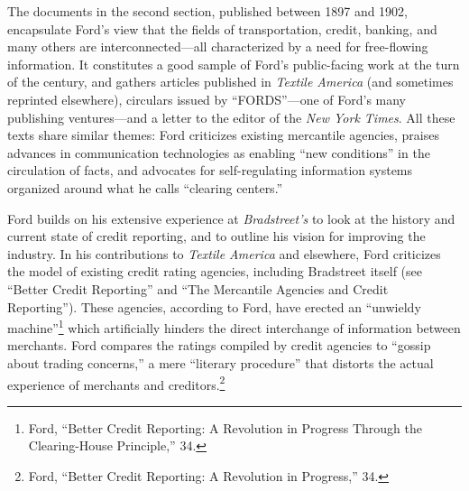 \documentclass[openany,nobib]{tufte-book}
\begin{document}
The documents in the second section, published between 1897 and 1902,
encapsulate Ford's view that the fields of transportation, credit,
banking, and many others are interconnected---all characterized by a
need for free-flowing information. It constitutes a good sample of
Ford's public-facing work at the turn of the century, and gathers
articles published in \emph{Textile America} (and sometimes reprinted
elsewhere), circulars issued by ``FORDS''---one of Ford's many
publishing ventures---and a letter to the editor of the \emph{New York
Times}. All these texts share similar themes: Ford criticizes existing
mercantile agencies, praises advances in communication technologies as
enabling ``new conditions'' in the circulation of facts, and advocates
for self-regulating information systems organized around what he calls
``clearing centers.''

Ford builds on his extensive experience at \emph{Bradstreet's} to look
at the history and current state of credit reporting, and to outline his
vision for improving the industry. In his contributions to \emph{Textile
America} and elsewhere, Ford criticizes the model of existing credit
rating agencies, including Bradstreet itself (see ``Better Credit
Reporting'' and ``The Mercantile Agencies and Credit Reporting''). These
agencies, according to Ford, have erected an ``unwieldy
machine''\footnote{Ford, ``Better Credit Reporting: A Revolution in
  Progress Through the Clearing-House Principle,'' 34.} which
artificially hinders the direct interchange of information between
merchants. Ford compares the ratings compiled by credit agencies to
``gossip about trading concerns,'' a mere ``literary procedure'' that
distorts the actual experience of merchants and creditors.\footnote{Ford,
  ``Better Credit Reporting: A Revolution in Progress,'' 34.}
\end{document}
